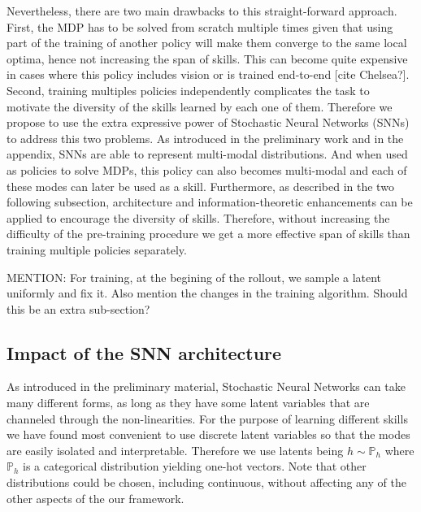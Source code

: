 \documentclass{article} %
\begin{document}
Nevertheless, there are two main drawbacks to this straight-forward approach. First, the MDP has to be solved from scratch multiple times given that using part of the training of another policy will make them converge to the same local optima, hence not increasing the span of skills. This can become quite expensive in cases where this policy includes vision or is trained end-to-end [cite Chelsea?]. Second, training multiples policies independently complicates the task to motivate the diversity of the skills learned by each one of them. Therefore we propose to use the extra expressive power of Stochastic Neural Networks (SNNs) to address this two problems. As introduced in the preliminary work and in the appendix, SNNs are able to represent multi-modal distributions. And when used as policies to solve MDPs, this policy can also becomes multi-modal and each of these modes can later be used as a skill. Furthermore, as described in the two following subsection, architecture and information-theoretic enhancements can be applied to encourage the diversity of skills. Therefore, without increasing the difficulty of the pre-training procedure we get a more effective span of skills than training multiple policies separately.

MENTION: For training, at the begining of the rollout, we sample a latent uniformly and fix it. Also mention the changes in the training algorithm. Should this be an extra sub-section? 

\subsection{Impact of the SNN architecture}
As introduced in the preliminary material, Stochastic Neural Networks can take many different forms, as long as they have some latent variables that are channeled through the non-linearities. For the purpose of learning different skills we have found most convenient to use discrete latent variables so that the modes are easily isolated and interpretable. Therefore we use latents being $h\sim \mathbb{P}_h$ where $\mathbb{P}_h$ is a categorical distribution yielding one-hot vectors. Note that other distributions could be chosen, including continuous, without affecting any of the other aspects of the our framework.
\end{document}
